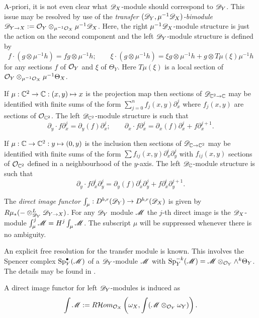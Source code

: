A-priori, it is not even clear what $\mathscr{D}_X$-module should correspond to $\mathscr{D}_Y$.
This issue may be resolved by use of the {\it transfer $(\mathscr{D}_Y,\mu^{-1}\mathscr{D}_X)$-bimodule} $\mathscr{D}_{Y\to X}:= \mathcal{O}_Y \otimes_{\mu^{-1}\mathcal{O}_X}\mu^{-1}\mathscr{D}_X$.
Here, the right $\mu^{-1}\mathscr{D}_X$-module structure is just the action on the second component and the left $\mathscr{D}_Y$-module structure is defined by
$$f\cdot (g\otimes \mu^{-1}h) = fg \otimes \mu^{-1}h; \qquad \xi\cdot (g\otimes\mu^{-1}h) = \xi g \otimes \mu^{-1}h + g \otimes T\mu(\xi)\mu^{-1}h $$
for any sections $f$ of $\mathcal{O}_Y$ and $\xi$ of $\Theta_Y$.
Here $T\mu(\xi)$ is a local section of $\mathcal{O}_Y\otimes_{\mu^{-1}\mathcal{O}_X} \mu^{-1}\Theta_X$.
\begin{example}
  If $\mu:\mathbb{C}^2 \to \mathbb{C}:(x,y)\mapsto x$ is the projection map then sections of $\mathscr{D}_{\mathbb{C}^2\to \mathbb{C} }$ may be identified with finite sums of the form $\sum_{j=0}^n f_j(x,y)\partial_x^j$ where $f_j(x,y)$ are sections of $\mathcal{O}_{\mathbb{C}^2}$.
  The left $\mathscr{D}_{\mathbb{C}^2}$-module structure is such that
  $$\partial_y \cdot f\partial_x^j = \partial_{y}(f)\partial_x^j;\qquad \partial_x\cdot f\partial_{x}^j = \partial_x(f)\partial_x^j + f \partial_x^{j+1}.$$
\end{example}
\begin{example}
  If $\mu:\mathbb{C} \to \mathbb{C}^2: y \mapsto (0,y)$ is the inclusion then sections of $\mathscr{D}_{\mathbb{C}\to \mathbb{C}^2}$ may be identified with finite sums of the form $\sum f_{ij}(x,y)\partial_x^i \partial_y^j$ with $f_{ij}(x,y)$ sections of $\mathcal{O}_{\mathbb{C}^2}$ defined in a neighbourhood of the $y$-axis.
  The left $\mathscr{D}_{\mathbb{C}}$-module structure is such that
  $$
    \partial_y \cdot f\partial_x^i\partial_y^j = \partial_{y}(f)\partial_x^i\partial_y^j + f \partial_x^i\partial_y^{j+1}.
  $$
\end{example}
\begin{definition}
  The {\it direct image functor} $\int_\mu:D^{b,r}(\mathscr{D}_Y)\to D^{b,r}(\mathscr{D}_X)$ is given by $R\mu_* ({-}\otimes_{\mathscr{D}_Y}^L \mathscr{D}_{Y\to X})$.
  For any $\mathscr{D}_Y$ module $\mathscr{M}$ the $j$-th direct image is the $\mathscr{D}_X$-module $\int_\mu^j \mathscr{M} = H^j \int_\mu \mathscr{M}$.
  The subscript $\mu$ will be suppressed whenever there is no ambiguity.
\end{definition}
\begin{remark}\label{rem: Spencer}
  An explicit free resolution for the transfer module is known.
  This involves the Spencer complex $\operatorname{Sp}_Y^\bullet(\mathscr{M})$ of a $\mathscr{D}_Y$-module $\mathscr{M}$ with $\operatorname{Sp}_Y^{-k}(\mathscr{M}) = \mathscr{M}\otimes_{\mathcal{O}_Y}\wedge^k \Theta_Y$.
  The details may be found in \cite{sabbah2011introduction}.
\end{remark}
\begin{remark}
  A direct image functor for left $\mathscr{D}_Y$-modules is induced as  $$\int\mathscr{M} := R\mathcal{H}om_{\mathcal{O}_X}\left(\omega_X,\int (\mathscr{M}\otimes_{\mathcal{O}_Y} \omega_Y)\right).$$
\end{remark}

